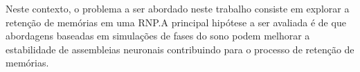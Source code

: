 Neste contexto, o problema a ser abordado neste trabalho consiste em explorar a retenção de memórias em uma RNP.\@ A principal
hipótese a ser avaliada é de que abordagens baseadas em simulações de fases do sono podem melhorar a estabilidade de assembleias
neuronais contribuindo para o processo de retenção de memórias.




